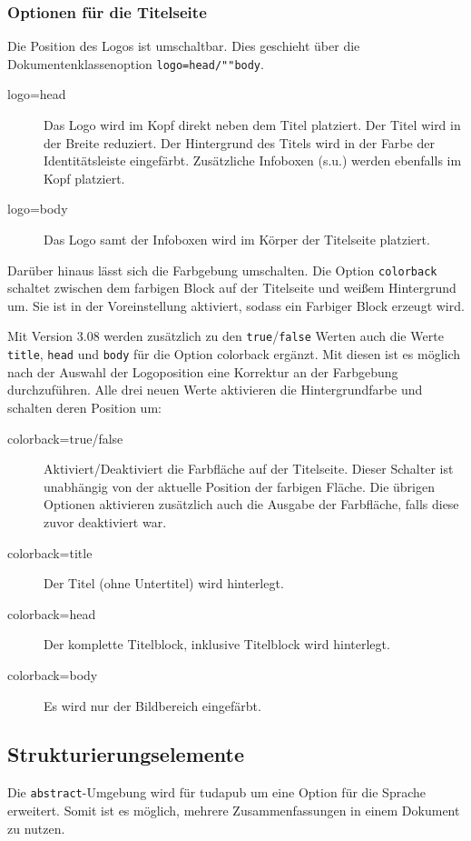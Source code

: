 \documentclass[
	german,
	accentcolor=9c,%
	]{tudapub}
\let\code\texttt
\let\cls\textsf
\begin{document}
\subsubsection{Optionen für die Titelseite}
Die Position des Logos ist umschaltbar. Dies geschieht über die Dokumentenklassenoption \code{logo=head/""body}.
\begin{description}
	\item[logo=head] Das Logo wird im Kopf direkt neben dem Titel platziert. Der Titel wird in der Breite reduziert. Der Hintergrund des Titels wird in der Farbe der Identitätsleiste eingefärbt. Zusätzliche Infoboxen (s.u.) werden ebenfalls im Kopf platziert.
	\item[logo=body] Das Logo samt der Infoboxen wird im Körper der Titelseite platziert.
\end{description}

Darüber hinaus lässt sich die Farbgebung umschalten.
Die Option \code{colorback} schaltet zwischen dem farbigen Block auf der Titelseite und weißem Hintergrund um. Sie ist in der Voreinstellung aktiviert, sodass ein Farbiger Block erzeugt wird.

Mit Version 3.08 werden zusätzlich zu den \code{true}/\code{false} Werten auch die Werte \code{title}, \code{head} und \code{body} für die Option colorback ergänzt.
Mit diesen ist es möglich nach der Auswahl der Logoposition eine Korrektur an der Farbgebung durchzuführen. Alle drei neuen Werte aktivieren die Hintergrundfarbe und schalten deren Position um:
\begin{description}
	\item[colorback=true/false] Aktiviert/Deaktiviert die Farbfläche auf der Titelseite. Dieser Schalter ist unabhängig von der aktuelle Position der farbigen Fläche. Die übrigen Optionen aktivieren zusätzlich auch die Ausgabe der Farbfläche, falls diese zuvor deaktiviert war.
	\item[colorback=title] Der Titel (ohne Untertitel) wird hinterlegt.
	\item[colorback=head] Der komplette Titelblock, inklusive Titelblock wird hinterlegt.
	\item[colorback=body] Es wird nur der Bildbereich eingefärbt.
\end{description}

\subsection{Strukturierungselemente}
Die \code{abstract}-Umgebung wird für \cls{tudapub} um eine Option für die Sprache erweitert. Somit ist es möglich, mehrere Zusammenfassungen in einem Dokument zu nutzen.
\end{document}
